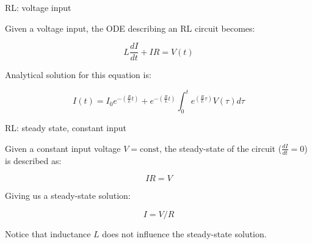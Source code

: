 \documentclass{beamer}
\begin{document}
\begin{frame}{RL: voltage input}
	\begin{flushleft}
		
		Given a voltage input, the ODE describing an RL circuit becomes:
		
		\begin{equation}
			L \frac{dI}{dt} + IR = V(t)
		\end{equation}
	
		Analytical solution for this equation is:
		
		\begin{equation}
			I(t) = I_0 e^{ -(\frac{R}{L} t)  } + e^{ -(\frac{R}{L} t)  } \int_0^t e^{ (\frac{R}{L} \tau)  } V(\tau) d\tau
		\end{equation}
		
		
	\end{flushleft}
\end{frame}




\begin{frame}{RL: steady state, constant input}
	\begin{flushleft}
		
		Given a constant input voltage $V = \text{const}$, the steady-state of the circuit ($\frac{dI}{dt} = 0$) is described as:
		
		\begin{equation}
			IR = V
		\end{equation}
		
		Giving us a steady-state solution:
		
		\begin{equation}
			I = V/R
		\end{equation}
		
		Notice that inductance $L$ does not influence the steady-state solution.
		
		
	\end{flushleft}
\end{frame}
\end{document}
